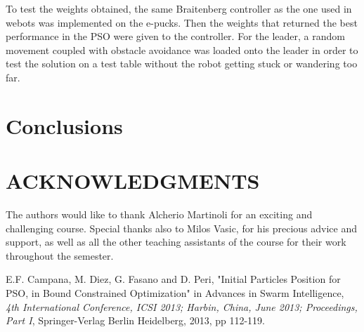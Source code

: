 \documentclass[a4paper, 10pt, conference]{ieeeconf}      %
\begin{document}
To test the weights obtained, the same Braitenberg controller as the one used in webots was implemented on the e-pucks. Then the weights that returned the best performance in the PSO were given to the controller. For the leader, a random movement coupled with obstacle avoidance was loaded onto the leader in order to test the solution on a test table without the robot getting stuck or wandering too far.

\section{Conclusions}

\section{ACKNOWLEDGMENTS}
The authors would like to thank Alcherio Martinoli for an exciting and challenging course. Special thanks also to Milos Vasic, for his precious advice and support, as well as all the other teaching assistants of the course for their work throughout the semester.

\begin{thebibliography}{99}

E.F. Campana, M. Diez, G. Fasano and D. Peri, "Initial Particles Position for PSO,
in Bound Constrained Optimization" in Advances in Swarm Intelligence, {\it 4th International Conference, ICSI 2013; Harbin, China, June 2013; Proceedings, Part I}, Springer-Verlag Berlin Heidelberg, 2013, pp 112-119.

\end{thebibliography}
\end{document}
